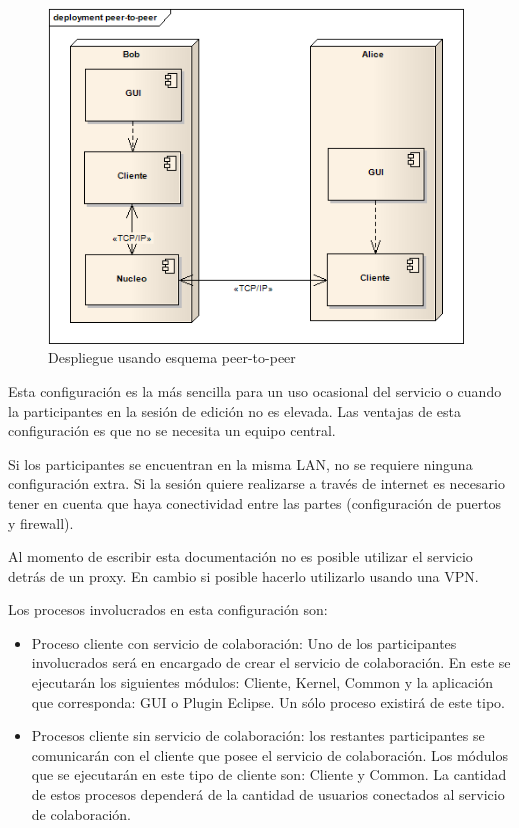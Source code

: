 \documentclass[12pt,a4paper]{article}
\begin{document}
	\begin{figure}[!ht]
		\begin{center}
			\includegraphics[width=11cm]{peer-to-peer.png}
			\caption{\label{peer-to-peer} Despliegue usando esquema peer-to-peer }
		\end{center}
	\end{figure}

Esta configuración es la más sencilla para un uso ocasional del servicio o cuando la participantes en la sesión de edición no
es elevada. Las ventajas de esta configuración es que no se necesita un equipo central.

Si los participantes se encuentran en la misma LAN, no se requiere ninguna configuración extra. Si la sesión quiere realizarse
a través de internet es necesario tener en cuenta que haya conectividad entre las partes (configuración de puertos y firewall).

Al momento de escribir esta documentación no es posible utilizar el servicio detrás de un proxy. En cambio si posible 
hacerlo utilizarlo usando una VPN.

Los procesos involucrados en esta configuración son:
\begin{itemize}
	\item Proceso cliente con servicio de colaboración: Uno de los participantes involucrados será en encargado de crear el
	servicio de colaboración. En este se ejecutarán los siguientes módulos: Cliente, Kernel, Common y la aplicación que
	corresponda: GUI o Plugin Eclipse. Un sólo proceso existirá de este tipo.
	\item Procesos cliente sin servicio de colaboración: los restantes participantes se comunicarán con el cliente que posee
	el servicio de colaboración. Los módulos que se ejecutarán en este tipo de cliente son: Cliente y Common. La cantidad de
	estos procesos dependerá de la cantidad de usuarios conectados al servicio de colaboración.
\end{itemize}
\end{document}

